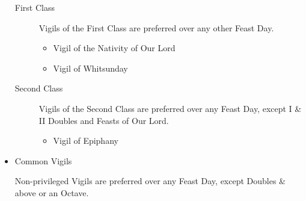 \begin{itemize}
\begin{description}
            \item[First Class] Vigils of the First Class are preferred over any other Feast Day.
                \begin{itemize}
                    \item Vigil of the Nativity of Our Lord
                    \item Vigil of Whitsunday
                \end{itemize}
            \item[Second Class] Vigils of the Second Class are preferred over any Feast Day, except I \& II Doubles and Feasts of Our Lord.
                \begin{itemize}
                    \item Vigil of Epiphany
                \end{itemize}
        \end{description}
    \item Common Vigils\par
        Non-privileged Vigils are preferred over any Feast Day, except Doubles \& above or an Octave.
\end{itemize}